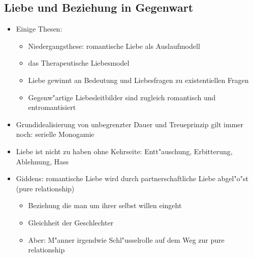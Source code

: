 \subsection{Liebe und Beziehung in Gegenwart}
\begin{itemize}
	\item
		Einige Thesen:
		\begin{itemize}
			\item
				Niedergangsthese: romantische Liebe als Auslaufmodell
			\item
				das Therapeutische Liebesmodel
			\item
				Liebe gewinnt an Bedeutung und Liebesfragen zu existentiellen Fragen
			\item
				Gegenw"artige Liebesleitbilder sind zugleich romantisch und entromantisiert
		\end{itemize}
	\item
		Grundidealisierung von unbegrenzter Dauer und Treueprinzip gilt immer noch: serielle Monogamie
	\item
		Liebe ist nicht zu haben ohne Kehrseite: Entt"auschung, Erbitterung, Ablehnung, Hass
	\item
		Giddens: romantische Liebe wird durch partnerschaftliche Liebe abgel"o"st (pure relationship)
		\begin{itemize}
			\item
				Beziehung die man um ihrer selbst willen eingeht
			\item
				Gleichheit der Geschlechter
			\item
				Aber: M"anner irgendwie Schl"usselrolle auf dem Weg zur pure relationship
		\end{itemize}
\end{itemize}
